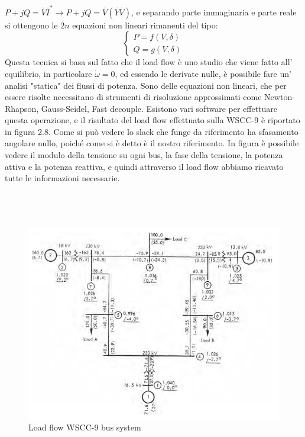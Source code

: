 \documentclass[Lau,noexaminfo]{sapthesis}
\begin{document}
	$P+jQ=\bar{V}\bar{I}^* \rightarrow P+jQ=\bar{V}(\bar{Y}\bar{V})$, e separando parte immaginaria e parte reale si ottengono le $2n$ equazioni non lineari rimanenti del tipo:\\
	\[
	\begin{cases}
	P=f(V,\delta)\\
	Q=g(V,\delta)
	\end{cases}
	\]
	Questa tecnica si basa sul fatto che il load flow è uno studio che viene fatto all' equilibrio, in particolare $\dot{\omega}=0$, ed essendo le derivate nulle, è possibile fare un' analisi "statica" dei flussi di potenza. Sono delle equazioni non lineari, che per essere risolte necessitano di strumenti di risoluzione approssimati come Newton-Rhapson, Gauss-Seidel, Fast decouple. Esistono vari software per effettuare questa operazione, e il risultato del load flow effettuato sulla WSCC-9 è riportato in figura 2.8. Come si può vedere lo slack che funge da riferimento ha sfasamento angolare nullo, poiché come si è detto è il nostro riferimento. In figura è possibile vedere il modulo della tensione su ogni bus, la fase della tensione, la potenza attiva e la potenza reattiva, e quindi attraverso il load flow abbiamo ricavato tutte le informazioni necessarie.\\\\\\\\
	\begin{figure}[h]
		\centering
		\includegraphics[scale=0.36]{WSCC-powerflow}
		\caption{Load flow WSCC-9 bus system}
	\end{figure}
\end{document}
